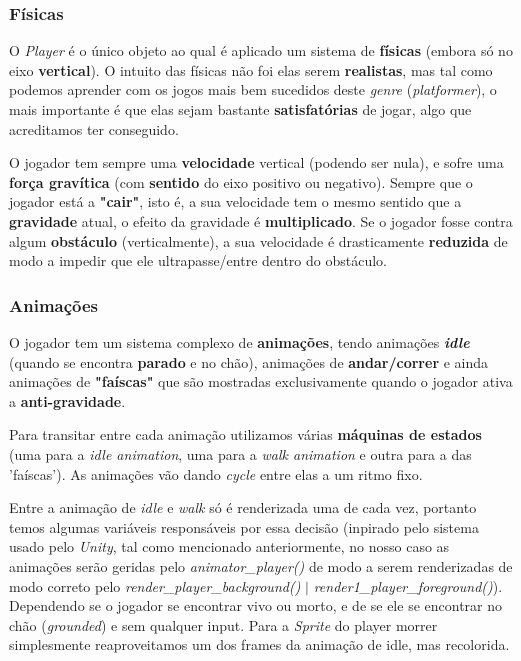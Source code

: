 \documentclass{report}
\begin{document}
\subsubsection{Físicas}

O \textit{Player} é o único objeto ao qual é aplicado um sistema de \textbf{físicas} (embora só no eixo \textbf{vertical}). O intuito das físicas não foi elas serem \textbf{realistas}, mas tal como podemos aprender com os jogos mais bem sucedidos deste \textit{genre} (\textit{platformer}), o mais importante é que elas sejam bastante \textbf{satisfatórias} de jogar, algo que acreditamos ter conseguido.

O jogador tem sempre uma \textbf{velocidade} vertical (podendo ser nula), e sofre uma \textbf{força gravítica} (com \textbf{sentido} do eixo positivo ou negativo). Sempre que o jogador está a \textbf{"cair"}, isto é, a sua velocidade tem o mesmo sentido que a \textbf{gravidade} atual, o efeito da gravidade é \textbf{multiplicado}. Se o jogador fosse contra algum \textbf{obstáculo} (verticalmente), a sua velocidade é drasticamente \textbf{reduzida} de modo a impedir que ele ultrapasse/entre dentro do obstáculo.

\subsubsection{Animações}

O jogador tem um sistema complexo de \textbf{animações}, tendo animações \textbf{\textit{idle}} (quando se encontra \textbf{parado} e no chão), animações de \textbf{andar/correr} e ainda animações de \textbf{"faíscas"} que são mostradas exclusivamente quando o jogador ativa a \textbf{anti-gravidade}.

Para transitar entre cada animação utilizamos várias \textbf{máquinas de estados} (uma para a \textit{idle animation}, uma para a \textit{walk animation} e outra para a das 'faíscas'). As animações vão dando \textit{cycle} entre elas a um ritmo fixo.

Entre a animação de \textit{idle} e \textit{walk} só é renderizada uma de cada vez, portanto temos algumas variáveis responsáveis por essa decisão (inpirado pelo sistema usado pelo \textit{Unity}, tal como mencionado anteriormente, no nosso caso as animações serão geridas pelo \textit{animator\_player()} de modo a serem renderizadas de modo correto pelo \textit{render\_player\_background()} \(|\) \textit{render1\_player\_foreground()}). Dependendo se o jogador se encontrar vivo ou morto, e de se ele se encontrar no chão (\textit{grounded}) e sem qualquer input. Para a \textit{Sprite} do player morrer simplesmente reaproveitamos um dos frames da animação de idle, mas recolorida.
\end{document}
